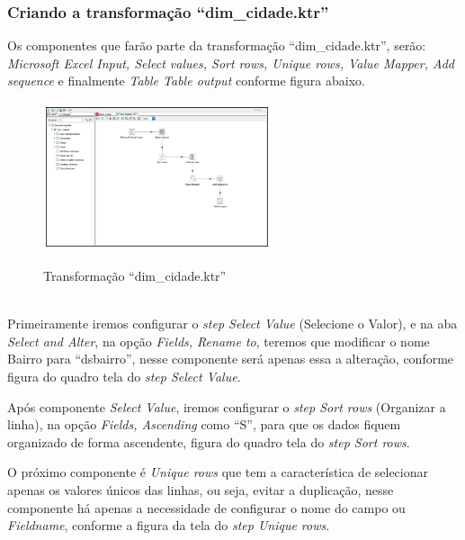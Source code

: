 \subsubsection{Criando a transforma\c{c}\~{a}o ``dim\_cidade.ktr''}

Os componentes que far\~{a}o parte da transforma\c{c}\~{a}o ``dim\_cidade.ktr'', ser\~{a}o: \textit{Microsoft Excel Input, Select values, Sort rows, Unique rows, Value Mapper, Add sequence} e finalmente \textit{Table Table output} conforme figura abaixo. 

\begin{figure}[H]
	\vspace*{0,2cm}
    \centering
    \caption{Transforma\c{c}\~{a}o ``dim\_cidade.ktr''}
    \includegraphics[width=0.6\textwidth]{./04-figuras/figura-trans-dim-cidade}
    \label{fig:ilustfigtransdimcidade}
\end{figure}
\vspace*{-0,9cm}
{\raggedright {}} \\

Primeiramente iremos configurar o \textit{step Select Value} (Selecione o Valor), e na aba \textit{Select and Alter}, na op\c{c}\~{a}o \textit{Fields, Rename to}, teremos que modificar o nome Bairro para ``ds\-bairro'', nesse componente ser\'{a} apenas essa a altera\c{c}\~{a}o, conforme figura do quadro tela do \textit{step Select Value}.

Ap\'os  componente \textit{Select Value}, iremos configurar o \textit{step Sort rows} (Organizar a linha), na op\c{c}\~{a}o \textit{Fields, Ascending} como ``S'', para que os dados fiquem organizado de forma ascendente, figura do quadro tela do \textit{step Sort rows}.

O pr\'oximo componente \'{e} \textit{Unique rows} que tem a caracter\'{i}stica de selecionar apenas os valores únicos das linhas, ou seja, evitar a duplica\c{c}\~{a}o, nesse componente h\'{a} apenas a necessidade de configurar o nome do campo ou \textit{Fieldname}, conforme a figura da tela do \textit{step Unique rows}.

